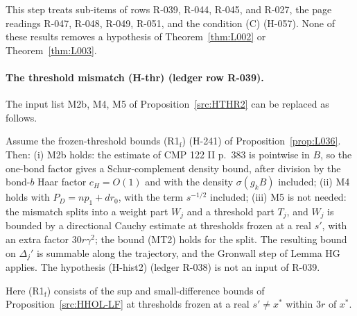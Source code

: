 This step treats sub-items of rows R-039, R-044, R-045, and R-027, the page readings R-047, R-048, R-049, R-051, and the condition (C) (H-057). None of these results removes a hypothesis of Theorem~\ref{thm:L002} or Theorem~\ref{thm:L003}.

\paragraph{The threshold mismatch (H-thr) (ledger row R-039).}
The input list M2b, M4, M5 of Proposition~\ref{src:HTHR2} can be replaced as follows.

\begin{proposition}\label{src:B15-M245}
Assume the frozen-threshold bounds (R1$_{\mathrm f}$) (H-241) of Proposition~\ref{prop:L036}. Then:
(i) M2b holds: the estimate of CMP 122 II p.~383 is pointwise in $B$, so the one-bond factor gives a Schur-complement density bound, after division by the bond-$b$ Haar factor $c_H=O(1)$ and with the density $\sigma(g_kB)$ included;
(ii) M4 holds with $P_D=np_1+dr_0$, with the term $s^{-1/2}$ included;
(iii) M5 is not needed: the mismatch splits into a weight part $W_j$ and a threshold part $T_j$, and $W_j$ is bounded by a directional Cauchy estimate at thresholds frozen at a real $s'$, with an extra factor $30r\gamma^2$; the bound (MT2) holds for the split.
The resulting bound on $\Delta_j'$ is summable along the trajectory, and the Gronwall step of Lemma HG applies. The hypothesis (H-hist2) (ledger R-038) is not an input of R-039.
\end{proposition}
Here (R1$_{\mathrm f}$) consists of the sup and small-difference bounds of Proposition~\ref{src:HHOL-LF} at thresholds frozen at a real $s'\ne x^*$ within $3r$ of $x^*$.

